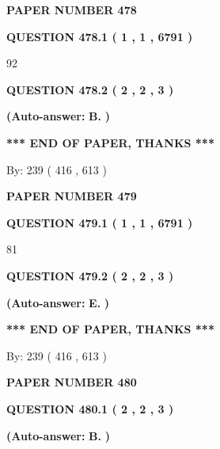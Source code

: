 \documentclass[12pt]{article}
\begin{document}
   
\newpage 
\setcounter{page}{ 
   478001 } 
   
   
 {\textbf{ \Large{ PAPER NUMBER  478  }}}
   
   
   
   
  
  
{\textbf{\large{QUESTION
478.1 
 ( 1 , 1 , 6791 )
}}}

92
  
  
{\textbf{\large{QUESTION
478.2 
 ( 2 , 2 , 3 )
}}}
 
 
{\textbf{(Auto-answer:}}
{\textbf{\large{
B.}}}
{\textbf{)}}
 
 
   
   
   
   
\vspace{1.0in} 
{\textbf{\large{ *** END OF PAPER, THANKS *** }}} 
   
   
\hspace{1.0in} By: 
 239 ( 416 ,  613 )
   
   
   
   
\newpage 
\setcounter{page}{ 
   479001 } 
   
   
 {\textbf{ \Large{ PAPER NUMBER  479  }}}
   
   
   
   
  
  
{\textbf{\large{QUESTION
479.1 
 ( 1 , 1 , 6791 )
}}}

81
  
  
{\textbf{\large{QUESTION
479.2 
 ( 2 , 2 , 3 )
}}}
 
 
{\textbf{(Auto-answer:}}
{\textbf{\large{
E.}}}
{\textbf{)}}
 
 
   
   
   
   
\vspace{1.0in} 
{\textbf{\large{ *** END OF PAPER, THANKS *** }}} 
   
   
\hspace{1.0in} By: 
 239 ( 416 ,  613 )
   
   
   
   
\newpage 
\setcounter{page}{ 
   480001 } 
   
   
 {\textbf{ \Large{ PAPER NUMBER  480  }}}
   
   
   
   
  
  
{\textbf{\large{QUESTION
480.1 
 ( 2 , 2 , 3 )
}}}
 
 
{\textbf{(Auto-answer:}}
{\textbf{\large{
B.}}}
{\textbf{)}}
 
 
  
\end{document}
